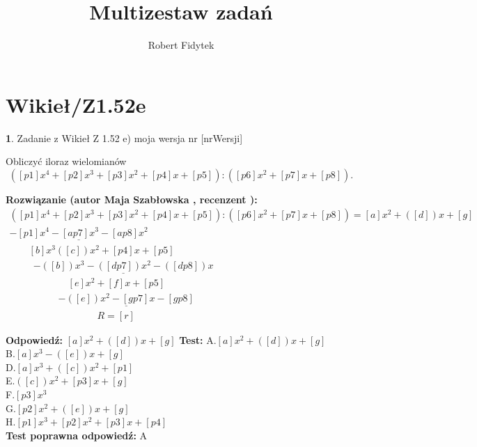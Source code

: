\documentclass[12pt, a4paper]{article}
\title{Multizestaw zadań}
\author{Robert Fidytek}
\date{}
\theoremstyle{definition} %
\newtheorem{zad}{}
\newcommand{\kategoria}[1]{\section{#1}} %
\newcommand{\zadStart}[1]{\begin{zad}#1\newline} %
\newcommand{\zadStop}{\end{zad}}   %
\newcommand{\rozwStart}[2]{\noindent \textbf{Rozwiązanie (autor #1 , recenzent #2): }\newline} %
\newcommand{\rozwStop}{\newline}                                            %
\newcommand{\odpStart}{\noindent \textbf{Odpowiedź:}\newline}    %
\newcommand{\odpStop}{\newline}                                             %
\newcommand{\testStart}{\noindent \textbf{Test:}\newline} %
\newcommand{\testStop}{\newline} %
\newcommand{\kluczStart}{\noindent \textbf{Test poprawna odpowiedź:}\newline} %
\newcommand{\kluczStop}{\newline} %
\begin{document}
\maketitle


\kategoria{Wikieł/Z1.52e}
\zadStart{Zadanie z Wikieł Z 1.52 e)  moja wersja nr [nrWersji]}

Obliczyć iloraz wielomianów $$([p1]x^{4}+[p2]x^{3}+[p3]x^{2}+[p4]x+[p5]):([p6]x^{2}+[p7]x+[p8]).$$

\zadStop

\rozwStart{Maja Szabłowska}{}
$$\begin{array}{lll}
([p1]x^{4}+[p2]x^{3}+[p3]x^{2}+[p4]x+[p5]):([p6]x^{2}+[p7]x+[p8])  =   [a]x^2  +([d])x +[g] \\
\underline{-[p1]x^4 -[ap7]x^3-[ap8]x^{2}} & &  \\
\qquad [b]x^3  ([c])x^2 +[p4]x +[p5] & & \\
\qquad \ \ \underline{-([b])x^3 -([dp7])x^2 -([dp8])x} & &\\
\qquad \qquad \qquad [e]x^2 + [f]x + [p5] & & \\
\qquad \qquad \quad \underline{-([e])x^2 - [gp7]x - [gp8]}  & & \\
\qquad \qquad \qquad \qquad \quad R = [r] & &
\end{array}$$
\rozwStop


\odpStart
$[a]x^2  +([d])x +[g]$
\odpStop
\testStart
A.$[a]x^2  +([d])x +[g]$\\
B.$[a]x^3 - ([e])x +[g]$\\
D.$[a]x^3 +([c])x^2 +[p1]$\\
E.$([c])x^2 + [p3]x +[g]$\\
F.$[p3]x^3 $\\
G.$[p2]x^2 + ([e])x +[g]$\\
H.$[p1]x^3 +[p2]x^2 + [p3]x +[p4]$\\
\testStop
\kluczStart
A
\kluczStop
\end{document}
